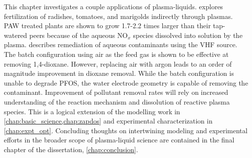This chapter investigates a couple applications of plasma-liquids.  explores fertilization of radishes, tomatoes, and marigolds indirectly through plasmas. PAW treated plants are shown to grow 1.7-2.2 times larger than their tap-watered peers because of the aqueous NO$_x$ species dissolved into solution by the plasma.  describes remediation of aqueous contaminants using the VHF source. The batch configuration using air as the feed gas is shown to be effective at removing 1,4-dioxane. However, replacing air with argon leads to an order of magnitude improvement in dioxane removal. While the batch configuration is unable to degrade PFOS, the water electrode geometry is capable of removing the contaminant. Improvement of pollutant removal rates will rely on increased understanding of the reaction mechanism and dissolution of reactive plasma species. This is a logical extension of the modelling work in \cref{chap:basic_science,chap:zapdos} and experimental characterization in \cref{chap:expt_opt}. Concluding thoughts on intertwining modeling and experimental efforts in the broader scope of plasma-liquid science are contained in the final chapter of the dissertation, \cref{chap:conclusion}.
